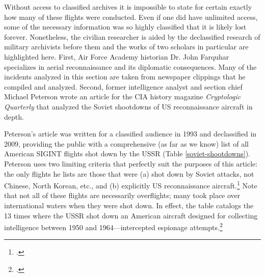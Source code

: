 \documentclass[14pt]{extarticle}
\begin{document}
Without access to classified archives it is impossible to state for certain exactly how many of these flights were conducted. Even if one did have unlimited access, some of the necessary information was so highly classified that it is likely lost forever. Nonetheless, the civilian researcher is aided by the declassified research of military archivists before them and the works of two scholars in particular are highlighted here. First, Air Force Academy historian Dr. John Farquhar specializes in aerial reconnaissance and its diplomatic consequences. Many of the incidents analyzed in this section are taken from newspaper clippings that he compiled and analyzed. Second, former intelligence analyst and section chief Michael Peterson wrote an article for the CIA history magazine \emph{Cryptologic Quarterly} that analyzed the Soviet shootdowns of US reconnaissance aircraft in depth.

Peterson's article was written for a classified audience in 1993 and declassified in 2009, providing the public with a comprehensive (as far as we know) list of all American SIGINT flights shot down by the USSR (Table \ref{soviet-shootdowns}). Peterson uses two limiting criteria that perfectly suit the purposes of this article: the only flights he lists are those that were (a) shot down by Soviet attacks, not Chinese, North Korean, etc., and (b) explicitly US reconnaissance aircraft.\footcite[p.~4]{peterson_maybe_1993} Note that not all of these flights are necessarily overflights; many took place over international waters when they were shot down. In effect, the table catalogs the 13 times where the USSR shot down an American aircraft designed for collecting intelligence between 1950 and 1964---intercepted espionage attempts.\footcite[p.~5. In the original document, this table lists the first incident as having taken place over the Barents Sea, not the Baltic Sea. Because the description of the mission---including a map of its route in the same document---takes place entirely over the Baltic sea, I have concluded that this has to be a typographical error, and corrected it here.]{peterson_maybe_1993}
\end{document}
